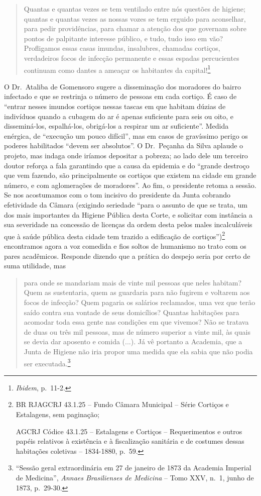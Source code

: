\begin{quote}
Quantas e quantas vezes se tem ventilado entre nós questões de higiene;
quantas e quantas vezes as nossas vozes se tem erguido para aconselhar,
para pedir providências, para chamar a atenção dos que governam sobre
pontos de palpitante interesse público, e tudo, tudo isso em vão?
Profligamos essas casas imundas, insalubres, chamadas cortiços,
verdadeiros focos de infecção permanente e essas espadas percucientes
continuam como dantes a ameaçar os habitantes da capital!\footnote{\emph{Ibidem},
  p.~11-2.}
\end{quote}

O Dr.~Ataliba de Gomensoro sugere a disseminação dos moradores do bairro
infectado e que se restrinja o número de pessoas em cada cortiço. É caso
de ``entrar nesses imundos cortiços nessas tascas em que habitam dúzias
de indivíduos quando a cubagem do ar é apenas suficiente para seis ou
oito, e disseminá-los, espalhá-los, obrigá-los a respirar um ar
suficiente''. Medida enérgica, de ``execução um pouco difícil'', mas em
casos de gravíssimo perigo os poderes habilitados ``devem ser
absolutos''. O Dr.~Peçanha da Silva aplaude o projeto, mas indaga onde
iríamos depositar a pobreza; ao lado dele um terceiro doutor reforça a
fala garantindo que a causa da epidemia e do ``grande destroço que vem
fazendo, são principalmente os cortiços que existem na cidade em grande
número, e com aglomerações de moradores''. Ao fim, o presidente retoma a
sessão. Se nos acostumamos com o tom incisivo do presidente da Junta
cobrando efetividade da Câmara (exigindo seriedade ``para o assunto de
que se trata, um dos mais importantes da Higiene Pública desta Corte, e
solicitar com instância a sua severidade na concessão de licenças da
ordem desta pelos males incalculáveis que à saúde pública desta cidade
tem trazido a edificação de cortiços'')\footnote{BR RJAGCRJ 43.1.25 --
  Fundo Câmara Municipal -- Série Cortiços e Estalagens, sem paginação;

  AGCRJ Códice 43.1.25 -- Estalagens e Cortiços -- Requerimentos e
  outros papéis relativos à existência e à fiscalização sanitária e de
  costumes dessas habitações coletivas -- 1834-1880, p.~59.} encontramos
agora a voz comedida e fios soltos de humanismo no trato com os pares
acadêmicos. Responde dizendo que a prática do despejo seria por certo de
suma utilidade, mas

\begin{quote}
para onde se mandariam mais de vinte mil pessoas que neles habitam? Quem
as sustentaria, quem as guardaria para não fugirem e voltarem aos focos
de infecção? Quem pagaria os salários reclamados, uma vez que terão
saído contra sua vontade de seus domicílios? Quantas habitações para
acomodar toda essa gente nas condições em que vivemos? Não se tratava de
duas ou três mil pessoas, mas de número superior a vinte mil, às quais
se devia dar aposento e comida (...). Já vê portanto a Academia, que a
Junta de Higiene não iria propor uma medida que ela sabia que não podia
ser executada.\footnote{``Sessão geral extraordinária em 27 de janeiro
  de 1873 da Academia Imperial de Medicina'', \emph{Annaes Brasilienses
  de Medicina} -- Tomo XXV, n.~1, junho de 1873, p.~29-30.}
\end{quote}

